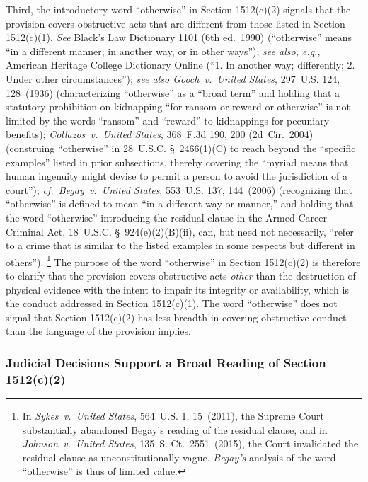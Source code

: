 Third, the introductory word ``otherwise'' in Section 1512(c)(2) signals that the provision covers obstructive acts that are different from those listed in Section 1512(c)(1).
\textit{See} Black's Law Dictionary 1101 (6th ed.~1990) (``otherwise'' means ``in a different manner; in another way, or in other ways'');
\textit{see also, e.g.}, American Heritage College Dictionary Online (``1. In another way; differently; 2. Under other circumstances'');
\textit{see also Gooch~v.\ United States}, 297~U.S. 124, 128~(1936) (characterizing ``otherwise'' as a ``broad term'' and holding that a statutory prohibition on kidnapping ``for ransom or reward or otherwise'' is not limited by the words ``ransom'' and ``reward'' to kidnappings for pecuniary benefits);
\textit{Collazos~v.\ United States}, 368~F.3d 190, 200 (2d~Cir.~2004) (construing ``otherwise'' in 28~U.S.C. \S~2466(1)(C) to reach beyond the ``specific examples'' listed in prior subsections, thereby covering the ``myriad means that human ingenuity might devise to permit a person to avoid the jurisdiction of a court'');
\textit{cf.~Begay~v.\ United States}, 553~U.S. 137, 144~(2006) (recognizing that ``otherwise'' is defined to mean ``in a different way or manner,'' and holding that the word ``otherwise'' introducing the residual clause in the Armed Career Criminal Act, 18~U.S.C. \S~924(e)(2)(B)(ii), can, but need not necessarily, ``refer to a crime that is similar to the listed examples in some respects but different in others'').%
\footnote{In \textit{Sykes~v.\ United States}, 564~U.S. 1, 15~(2011), the Supreme Court substantially abandoned Begay's reading of the residual clause, and in \textit{Johnson~v.\ United States}, 135~S. Ct.~2551~(2015), the Court invalidated the residual clause as unconstitutionally vague.
\textit{Begay's} analysis of the word ``otherwise'' is thus of limited value.}
The purpose of the word ``otherwise'' in Section 1512(c)(2) is therefore to clarify that the provision covers obstructive acts \textit{other} than the destruction of physical evidence with the intent to impair its integrity or availability, which is the conduct addressed in Section 1512(c)(1).
The word ``otherwise'' does not signal that Section 1512(c)(2) has less breadth in covering obstructive conduct than the language of the provision implies.

\subsubsection{Judicial Decisions Support a Broad Reading of Section 1512(c)(2)}

